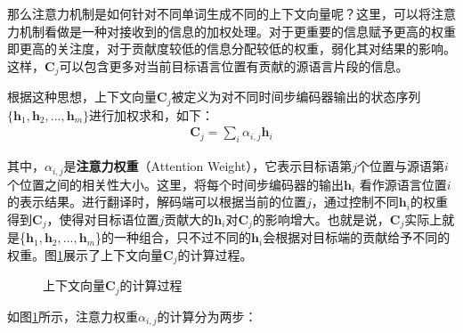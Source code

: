 \parinterval 那么注意力机制是如何针对不同单词生成不同的上下文向量呢？这里，可以将注意力机制看做是一种对接收到的信息的加权处理。对于更重要的信息赋予更高的权重即更高的关注度，对于贡献度较低的信息分配较低的权重，弱化其对结果的影响。这样，$\mathbf{C}_j$可以包含更多对当前目标语言位置有贡献的源语言片段的信息。

\parinterval 根据这种思想，上下文向量$\mathbf{C}_j$被定义为对不同时间步编码器输出的状态序列$\{ \mathbf{h}_1, \mathbf{h}_2,...,\mathbf{h}_m \}$进行加权求和，如下：
\begin{eqnarray}
\mathbf{C}_j=\sum_{i} \alpha_{i,j} \mathbf{h}_i
\label{eq:6-22}
\end{eqnarray}

\noindent 其中，$\alpha_{i,j}$是{\small\sffamily\bfseries{注意力权重}}（Attention Weight），它表示目标语第$j$个位置与源语第$i$个位置之间的相关性大小。这里，将每个时间步编码器的输出$\mathbf{h}_i$ 看作源语言位置$i$的表示结果。进行翻译时，解码端可以根据当前的位置$j$，通过控制不同$\mathbf{h}_i$的权重得到$\mathbf{C}_j$，使得对目标语位置$j$贡献大的$\mathbf{h}_i$对$\mathbf{C}_j$的影响增大。也就是说，$\mathbf{C}_j$实际上就是\{${\mathbf{h}_1, \mathbf{h}_2,...,\mathbf{h}_m}$\}的一种组合，只不过不同的$\mathbf{h}_i$会根据对目标端的贡献给予不同的权重。图\ref{fig:6-23}展示了上下文向量$\mathbf{C}_j$的计算过程。

\begin{figure}[htp]
\centering

\caption{上下文向量$\mathbf{C}_j$的计算过程}
\label{fig:6-23}
\end{figure}

\parinterval 如图\ref{fig:6-23}所示，注意力权重$\alpha_{i,j}$的计算分为两步：

